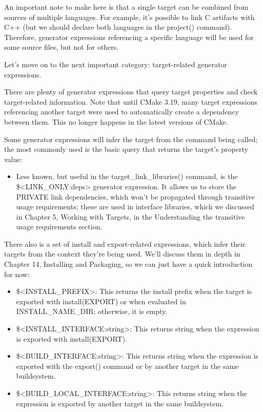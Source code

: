 An important note to make here is that a single target can be combined from sources of multiple languages. For example, it’s possible to link C artifacts with C++ (but we should declare both languages in the project() command). Therefore, generator expressions referencing a specific language will be used for some source files, but not for others.

Let’s move on to the next important category: target-related generator expressions.


There are plenty of generator expressions that query target properties and check target-related information. Note that until CMake 3.19, many target expressions referencing another target were used to automatically create a dependency between them. This no longer happens in the latest versions of CMake.

Some generator expressions will infer the target from the command being called; the most commonly used is the basic query that returns the target’s property value:


\begin{itemize}
\item
Less known, but useful in the target\_link\_libraries() command, is the \$<LINK\_ONLY:deps> generator expression. It allows us to store the PRIVATE link dependencies, which won’t be propagated through transitive usage requirements; these are used in interface libraries, which we discussed in Chapter 5, Working with Targets, in the Understanding the transitive usage requirements section.
\end{itemize}

There also is a set of install and export-related expressions, which infer their targets from the context they’re being used. We’ll discuss them in depth in Chapter 14, Installing and Packaging, so we can just have a quick introduction for now:

\begin{itemize}
\item
\$<INSTALL\_PREFIX>: This returns the install prefix when the target is exported with install(EXPORT) or when evaluated in INSTALL\_NAME\_DIR; otherwise, it is empty.

\item
\$<INSTALL\_INTERFACE:string>: This returns string when the expression is exported with install(EXPORT).

\item
\$<BUILD\_INTERFACE:string>: This returns string when the expression is exported with the export() command or by another target in the same buildsystem.

\item
\$<BUILD\_LOCAL\_INTERFACE:string>: This returns string when the expression is exported by another target in the same buildsystem.
\end{itemize}

